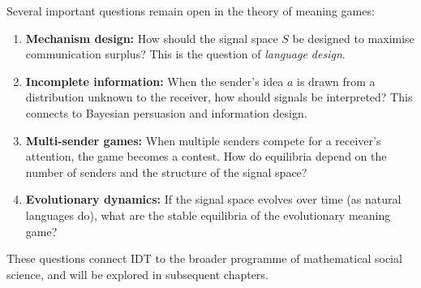 \begin{remark}
Several important questions remain open in the theory of meaning games:
\begin{enumerate}
\item \textbf{Mechanism design:} How should the signal space $S$ be designed
  to maximise communication surplus?  This is the question of
  \emph{language design}.
\item \textbf{Incomplete information:} When the sender's idea $a$ is drawn
  from a distribution unknown to the receiver, how should signals be
  interpreted?  This connects to Bayesian persuasion and information design.
\item \textbf{Multi-sender games:} When multiple senders compete for a
  receiver's attention, the game becomes a contest.  How do equilibria
  depend on the number of senders and the structure of the signal space?
\item \textbf{Evolutionary dynamics:} If the signal space evolves over time
  (as natural languages do), what are the stable equilibria of the
  evolutionary meaning game?
\end{enumerate}
These questions connect IDT to the broader programme of mathematical
social science, and will be explored in subsequent chapters.
\end{remark}

